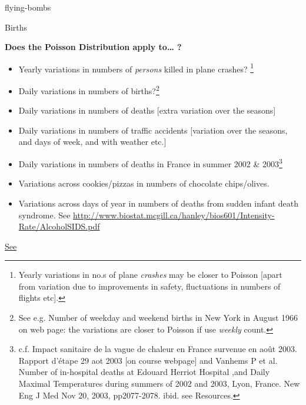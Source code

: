 \documentclass[]{book}
\providecommand{\tightlist}{%
  \setlength{\itemsep}{0pt}\setlength{\parskip}{0pt}}
\begin{document}
flying-bombs

Births

\textbf{Does the Poisson Distribution apply to\ldots{} ?}

\begin{itemize}
\tightlist
\item
  Yearly variations in numbers of \textit{persons} killed in
  plane crashes? \footnote{Yearly variations in no.s of plane\textit{ crashes} may
  be closer to Poisson [apart from
  variation due to improvements in safety,
  fluctuations in numbers of flights etc].}
\item
  Daily variations in numbers of births?\footnote{
  See e.g. Number of weekday and weekend births
  in New York in August 1966 on web page: the variations are closer to Poisson if use \textit{weekly} count.}
\item
  Daily variations in numbers of deaths {[}extra variation over the seasons{]}
\item
  Daily variations in numbers of traffic accidents
  {[}variation over the seasons, and days of week, and
  with weather etc.{]}
\item
  Daily variations in numbers of deaths in France in
  summer 2002 \& 2003\footnote{c.f. Impact sanitaire de la vague de chaleur en France survenue en ao\^ut 2003. Rapport d'\'etape 29 aot 2003
  [on course webpage] and Vanhems P et al. Number of in-hospital deaths at
  Edouard Herriot Hospital ,and Daily Maximal
  Temperatures during summers of 2002 and 2003, Lyon,
  France. New Eng J Med Nov 20, 2003, pp2077-2078.
  ibid. see Resources.}
\item
  Variations across cookies/pizzas in numbers of chocolate chips/olives.
\item
  Variations across days of year in numbers of deaths from sudden infant death syndrome. See \url{http://www.biostat.mcgill.ca/hanley/bios601/Intensity-Rate/AlcoholSIDS.pdf}
\end{itemize}

\href{https://www.jstor.org/stable/1403193?seq=1}{See}
\end{document}
